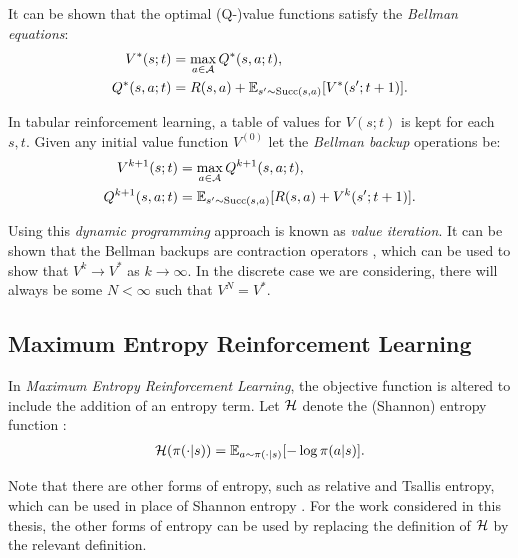     It can be shown  that the optimal (Q-)value functions satisfy the \textit{Bellman equations}:
    \begin{align}
        V^*(s;t) &= \max_{a\in\mathcal{A}} Q^*(s,a;t), \\
        Q^*(s,a;t) &= R(s,a) + \mathbb{E}_{s'\sim {\textnormal{Succ}(s,a)}} [V^*(s';t+1)].
    \end{align} 

    In tabular reinforcement learning, a table of values for $V(s;t)$  is kept for each $s,t$. Given any initial value function $V^{(0)}$ let the \textit{Bellman backup} operations be:
    \begin{align}
        V^{k+1}(s;t) &= \max_{a\in\mathcal{A}} Q^{k+1}(s,a;t), \\
        Q^{k+1}(s,a;t) &= \mathbb{E}_{s'\sim {\textnormal{Succ}(s,a)}} [R(s,a) + V^k(s';t+1)].
    \end{align}

    Using this \textit{dynamic programming} approach is known as \textit{value iteration}. It can be shown that the Bellman backups are contraction operators , which can be used to show that $V^{k}\rightarrow V^*$ as $k\rightarrow \infty$. In the discrete  case we are considering, there will always be some $N<\infty$ such that $V^{N}=V^*$.



    \subsection{Maximum Entropy Reinforcement Learning}
    \label{sec:2-2-merl}

        In \textit{Maximum Entropy Reinforcement Learning}, the objective function is altered to include the addition of an entropy term. Let $\mathcal{H}$ denote the (Shannon) entropy function :
        \begin{align}
            \mathcal{H}(\pi(\cdot|s)) = \mathbb{E}_{a\sim\pi(\cdot|s)}[-\log \pi(a|s)].
        \end{align}

        Note that there are other forms of entropy, such as relative and Tsallis entropy, which can be used in place of Shannon entropy . For the work considered in this thesis, the other forms of entropy can be used by replacing the definition of $\mathcal{H}$ by the relevant definition.

